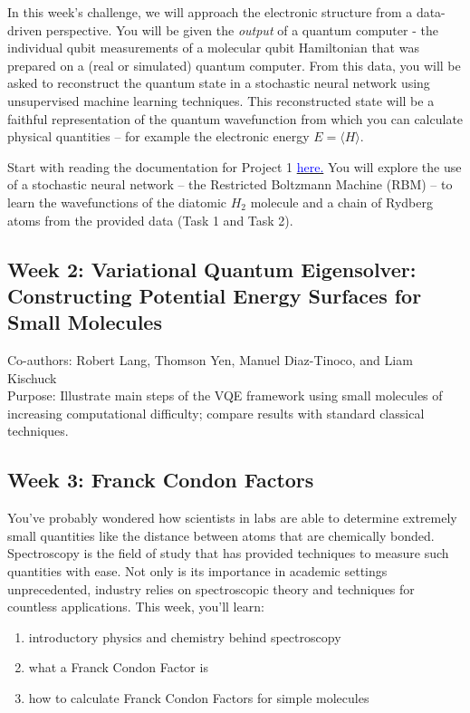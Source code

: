 \documentclass[12pt]{article}
\begin{document}
In this week's challenge, we will approach the electronic structure from a data-driven perspective.  You will be given the {\it output} of a quantum computer - the individual qubit measurements of a molecular qubit Hamiltonian that was prepared
on a (real or simulated) quantum computer. From this data, you will be asked to reconstruct the quantum state in a stochastic neural network using unsupervised machine learning techniques.  This reconstructed state will be a faithful representation of 
the quantum wavefunction from which you can calculate physical quantities -- for example the electronic energy $E = \langle H \rangle$.

Start with reading the documentation for Project 1
\href{https://github.com/CDL-Quantum/CohortProject_2020/tree/master/Project_1_RBM_and_Tomography}{\textcolor{blue}{here.}}
You will explore the use of a stochastic neural network -- the Restricted Boltzmann Machine (RBM) -- to learn the wavefunctions of the diatomic $H_2$ molecule 
and a chain of Rydberg atoms from the provided data (Task 1 and Task 2).  


\newpage


\subsection{Week 2: Variational Quantum Eigensolver: Constructing Potential Energy Surfaces for Small Molecules}

Co-authors: Robert Lang, Thomson Yen, Manuel Diaz-Tinoco, and Liam Kischuck
\\
Purpose: Illustrate main steps of the VQE framework using small molecules of increasing computational difficulty; compare results with standard classical techniques.

\newpage

\subsection{Week 3: Franck Condon Factors}

You've probably wondered how scientists in labs are able to determine extremely small quantities like the distance between atoms that are chemically bonded. 
Spectroscopy is the field of study that has provided techniques to measure such quantities with ease. Not only is its importance in academic settings unprecedented, industry relies on spectroscopic theory and techniques for countless applications. This week, you'll learn:

\begin{enumerate}
    \item introductory physics and chemistry behind spectroscopy
    \item what a Franck Condon Factor is
    \item how to calculate Franck Condon Factors for simple molecules
\end{enumerate}
\end{document}
